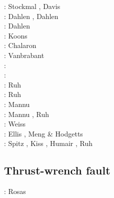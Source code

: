 \begin{scriptsize}
\nineteeneightythree: Stockmal \cite{stoc83}, Davis \etal \cite{dasd83}\\
\nineteeneightyfour: Dahlen \cite{dahl84}, Dahlen \etal \cite{dasd84}\\
\nineteenninety: Dahlen \cite{dahl90}\\
\nineteenninetyfour: Koons \cite{koon94}\\
\nineteenninetyfour: Chalaron \etal \cite{chmm95} \\
\nineteenninetynine: Vanbrabant \etal \cite{vajh99}\\
\twothousandthree: \cite{wiep03}\cite{smbs03}\cite{muso03}\cite{vamf03}\\
\twothousandsix: \cite{simp06}\cite{yabm06}\\
\twothousandtwelve: Ruh \etal \cite{rukb12}\\
\twothousandthirteen: Ruh \etal \cite{rugb13}\\
\twothousandsixteen: Mannu \etal \cite{mauw16}\\
\twothousandseventeen: Mannu \etal \cite{mauw17}, Ruh \etal \cite{rugb17}\\
\twothousandeighteen: Weiss \etal \cite{weib18}\\
\twothousandnineteen: Ellis \etal \cite{elgb19}, Meng \& Hodgetts \cite{meho19,meho19b}\\
\twothousandtwenty: Spitz \etal \cite{spsk20,spbe20}, Kiss \etal \cite{kids20}, 
                    Humair \etal \cite{hube20}, Ruh \cite{ruh20}
\end{scriptsize}

\subsection{Thrust-wrench fault} 

\begin{scriptsize}
\twothousandfifteen: Rosas \etal \cite{rods15}
\end{scriptsize}

